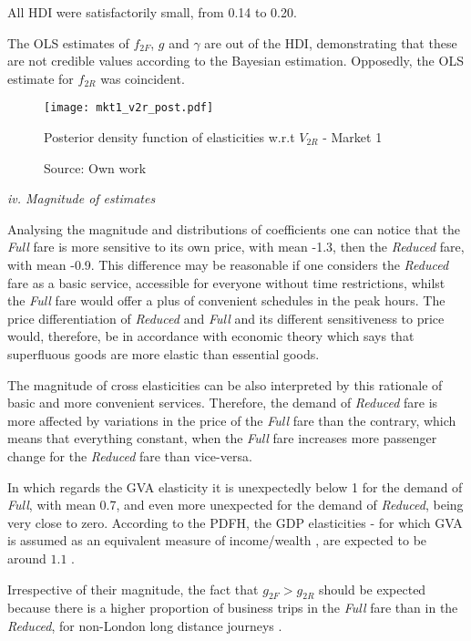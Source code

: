 All HDI were satisfactorily small, from 0.14 to 0.20. 

The OLS estimates of $f_{2F}$, $g$ and $\gamma$ are out of the HDI, demonstrating that these are not credible values according to the Bayesian estimation. Opposedly, the OLS estimate for $f_{2R}$ was coincident. 

\begin{figure}[H]
\centering
\texttt{[image: mkt1\_v2r\_post.pdf]}
\caption{Posterior density function of elasticities w.r.t  $V_{2R}$ - Market 1}
\label{fig:mkt1_v2r_post}
\caption*{Source: Own work}
\end{figure} 

\textit{iv. Magnitude of estimates}

Analysing the magnitude and distributions of coefficients one can notice that the \textit{Full} fare is more sensitive to its own price, with mean -1.3, then the \textit{Reduced} fare, with mean -0.9. This difference may be reasonable if one considers the \textit{Reduced} fare as a basic service, accessible for everyone without time restrictions, whilst the \textit{Full} fare would offer a plus of convenient schedules in the peak hours. The price differentiation of \textit{Reduced} and \textit{Full} and its different sensitiveness to price would, therefore, be in accordance with economic theory which says that superfluous goods are more elastic than essential goods.

The magnitude of cross elasticities can be also interpreted by this rationale of basic and more convenient services. Therefore, the demand of \textit{Reduced} fare is more affected by variations in the price of the \textit{Full} fare than the contrary, which means that everything constant, when the \textit{Full} fare increases more passenger change for the \textit{Reduced} fare than vice-versa.

In which regards the GVA elasticity it is unexpectedly below 1 for the demand of \textit{Full}, with mean 0.7, and even more unexpected for the demand of \textit{Reduced}, being very close to zero. According to the PDFH, the GDP elasticities - for which GVA is assumed as an equivalent measure of income/wealth \citep[p.~ 4, Chapter B1]{pdfhv5}, are expected to be around $1.1$ \citep[p.~9, Chapter B1]{pdfhv5}. 

Irrespective of their magnitude, the fact that $g_{2F} > g_{2R}$ should be expected because there is a higher proportion of business trips in the \textit{Full} fare than in the \textit{Reduced}, for non-London long distance journeys \citep{pdfhv5}.

